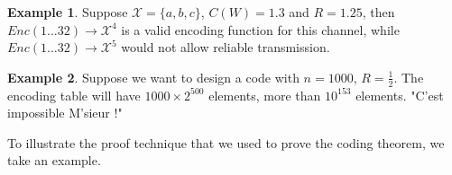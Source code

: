 \documentclass{article}
\theoremstyle{definition} %
\newtheorem{example}{Example}
\def\X{\mathcal{X}}
\begin{document}
\begin{example}
  Suppose $\X = \{a,b,c\}$, $C(W)=1.3$ and $R=1.25$, then $Enc(1 \dots 32) \to \X^4$ is a valid encoding function for this channel, while $Enc(1 \dots 32) \to \X^5$ would not allow reliable transmission.
\end{example}

\begin{example}
  Suppose we want to design a code with $n=1000$, $R=\frac 1 2$. The encoding table will have $1000 \times 2^{500}$ elements, more than $10^{153}$ elements. "C'est impossible M'sieur !"
\end{example}




To illustrate the proof technique that we used to prove the coding theorem, we take an example.
\end{document}
